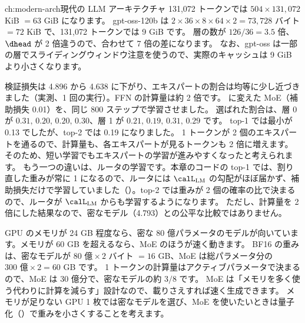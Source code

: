 \begin{answers}{ch:modern-arch}{現代の LLM アーキテクチャ}
131,072 トークンでは $504\times131{,}072$ KiB $=63$ GiB になります。
gpt-oss-120b は $2\times36\times8\times64\times2=73{,}728$ バイト $=72$ KiB で、131,072 トークンでは 9 GiB です。
層の数が $126/36=3.5$ 倍、$\dhead$ が 2 倍違うので、合わせて 7 倍の差になります。
なお、gpt-oss は一部の層でスライディングウィンドウ注意を使うので、実際のキャッシュは 9 GiB より小さくなります。
\item 検証損失は 4.896 から 4.638 に下がり、エキスパートの割合は均等に少し近づきました（実測、1 回の実行）。FFN の計算量は約 2 倍です。
 に変えた MoE（補助損失 0.01）を、同じ 800 ステップで学習させました。
選ばれた割合は、層 0 が $0.31,\,0.20,\,0.20,\,0.30$、層 1 が $0.21,\,0.19,\,0.31,\,0.29$ です。
top-1 では最小が 0.13 でしたが、top-2 では 0.19 になりました。
1 トークンが 2 個のエキスパートを通るので、計算量も、各エキスパートが見るトークンも 2 倍に増えます。
そのため、短い学習でもエキスパートの学習が進みやすくなったと考えられます。
もう一つの違いは、ルータの学習です。本章のコードの top-1 では、割り直した重みが常に 1 になるので、ルータには $\calL_{\mathrm{LM}}$ の勾配がほぼ届かず、補助損失だけで学習していました（）。top-2 では重みが 2 個の確率の比で決まるので、ルータが $\calL_{\mathrm{LM}}$ からも学習するようになります。
ただし、計算量を 2 倍にした結果なので、密なモデル（4.793）との公平な比較ではありません。
\item GPU のメモリが 24 GB 程度なら、密な 80 億パラメータのモデルが向いています。メモリが 60 GB を超えるなら、MoE のほうが速く動きます。
BF16 の重みは、密なモデルが $80\text{ 億}\times2$ バイト $=16$ GB、MoE は総パラメータ分の $300\text{ 億}\times2=60$ GB です。
1 トークンの計算量はアクティブパラメータで決まるので、MoE は 30 億分で、密なモデルの約 $3/8$ です。
MoE は「メモリを多く使う代わりに計算を減らす」設計なので、載りさえすれば速く生成できます。
メモリが足りない GPU 1 枚では密なモデルを選び、MoE を使いたいときは量子化（）で重みを小さくすることを考えます。
\end{answers}
